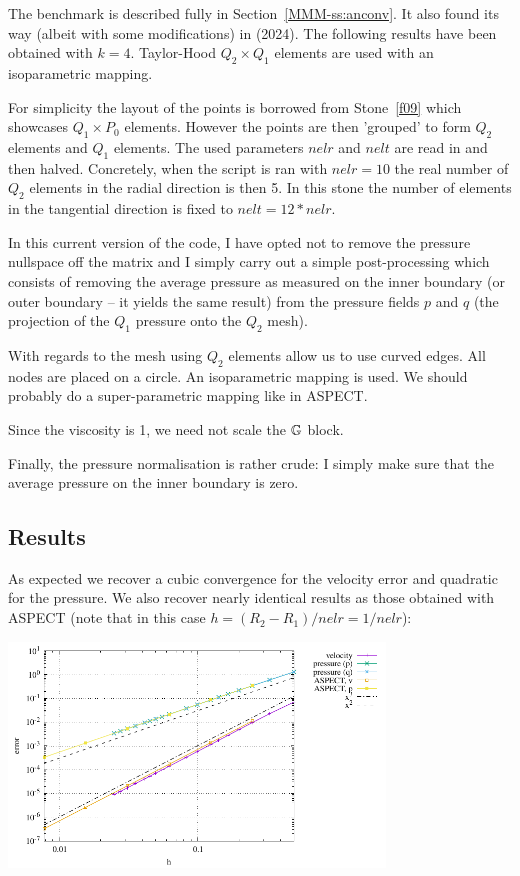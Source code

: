 
The benchmark is described fully in Section~\ref{MMM-ss:anconv}.
It also found its way (albeit with some modifications) in \textcite{gadb24} (2024). 
The following results have been obtained with $k=4$.
Taylor-Hood $Q_2\times Q_1$ elements are used with an isoparametric mapping. 

For simplicity the layout of the points is borrowed from Stone~\ref{f09} which 
showcases $Q_1 \times P_0$ elements. However the points are then 'grouped' 
to form $Q_2$ elements and $Q_1$ elements. 
The used parameters $nelr$ and $nelt$ are read in and then halved. Concretely, 
when the script is ran with $nelr=10$ the real number of $Q_2$ elements 
in the radial direction is then 5. In this stone the number of elements
in the tangential direction is fixed to $nelt=12*nelr$.

In this current version of the code, I have opted not to remove the pressure nullspace
off the matrix and I simply carry out a simple post-processing which consists of 
removing the average pressure as measured on the inner boundary (or outer boundary -- it 
yields the same result) from the pressure fields $p$ and $q$ (the projection of the 
$Q_1$ pressure onto the $Q_2$ mesh). 

With regards to the mesh using $Q_2$ elements allow us to use curved edges.
All nodes are placed on a circle. An isoparametric mapping is used.
We should probably do a super-parametric mapping like in ASPECT. 

Since the viscosity is 1, we need not scale the ${\mathbb{G}}$ block.

Finally, the pressure normalisation is rather crude: I simply make sure that 
the average pressure on the inner boundary is zero.

\subsection*{Results}

As expected we recover a cubic convergence for the velocity error and quadratic for the 
pressure. We also recover nearly identical results as those obtained with ASPECT (note that 
in this case $h=(R_2-R_1)/nelr=1/nelr$): 

\begin{center}
\includegraphics[width=10cm]{python_codes/fieldstone_21/RESULTS/errors.pdf}
\end{center}

